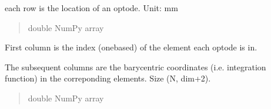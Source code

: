 \documentclass[letterpaper,10pt,english]{sphinxmanual}
\begin{document}
\begin{fulllineitems}
\begin{fulllineitems}
\begin{quote}
\begin{description}
\end{description}\end{quote}

\end{fulllineitems}


\begin{fulllineitems}
\label{\detokenize{_autosummary/nirfasterff.base.optodes.optode:nirfasterff.base.optodes.optode.coord}}
\pysigstartsignatures
\pysigline
{}
\pysigstopsignatures
\sphinxAtStartPar
each row is the location of an optode. Unit: mm
\begin{quote}\begin{description}
\sphinxAtStartPar
double NumPy array

\end{description}\end{quote}

\end{fulllineitems}


\begin{fulllineitems}
\label{\detokenize{_autosummary/nirfasterff.base.optodes.optode:nirfasterff.base.optodes.optode.int_func}}
\pysigstartsignatures
\pysigline
{}
\pysigstopsignatures
\sphinxAtStartPar
First column is the index (one\sphinxhyphen{}based) of the element each optode is in.

\sphinxAtStartPar
The subsequent columns are the barycentric coordinates (i.e. integration function) in the correponding elements. Size (N, dim+2).
\begin{quote}\begin{description}
\sphinxAtStartPar
double NumPy array

\end{description}\end{quote}

\end{fulllineitems}



\end{fulllineitems}
\end{document}
